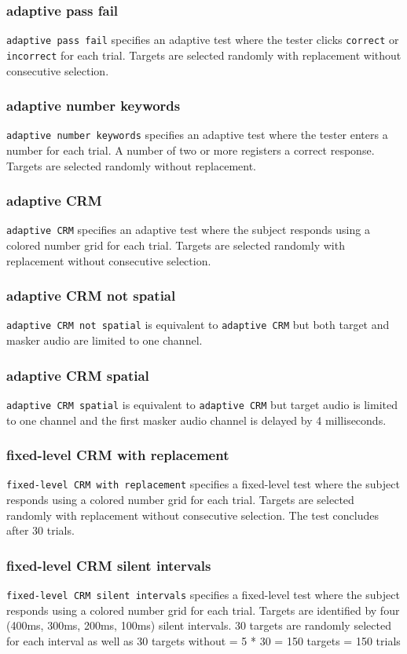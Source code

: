 \documentclass[11pt,pdftex,letterpaper]{article}
\begin{document}
\subsubsection{adaptive pass fail}
\texttt{adaptive pass fail} specifies an adaptive test where the tester clicks \texttt{correct} or \texttt{incorrect} for each trial. Targets are selected randomly with replacement without consecutive selection.
\subsubsection{adaptive number keywords}
\texttt{adaptive number keywords} specifies an adaptive test where the tester enters a number for each trial. A number of two or more registers a correct response. Targets are selected randomly without replacement.
\subsubsection{adaptive CRM}
\texttt{adaptive CRM} specifies an adaptive test where the subject responds using a colored number grid for each trial. Targets are selected randomly with replacement without consecutive selection.
\subsubsection{adaptive CRM not spatial}
\texttt{adaptive CRM not spatial} is equivalent to \texttt{adaptive CRM} but both target and masker audio are limited to one channel.
\subsubsection{adaptive CRM spatial}
\texttt{adaptive CRM spatial} is equivalent to \texttt{adaptive CRM} but target audio is limited to one channel and the first masker audio channel is delayed by 4 milliseconds.
\subsubsection{fixed-level CRM with replacement}
\texttt{fixed-level CRM with replacement} specifies a fixed-level test where the subject responds using a colored number grid for each trial. Targets are selected randomly with replacement without consecutive selection. The test concludes after 30 trials.
\subsubsection{fixed-level CRM silent intervals}
\texttt{fixed-level CRM silent intervals} specifies a fixed-level test where the subject responds using a colored number grid for each trial. Targets are identified by four (400ms, 300ms, 200ms, 100ms) silent intervals. 30 targets are randomly selected for each interval as well as 30 targets without = 5 * 30 = 150 targets = 150 trials
\end{document}
